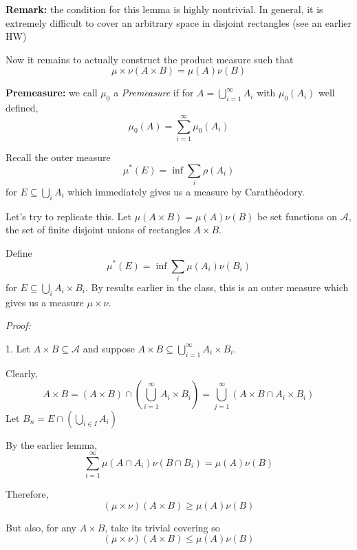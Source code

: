 \documentclass[12pt]{report}
\newcommand{\A}{\mathcal{A}}
\newcommand{\sub}{\subseteq}
\newcommand*{\tbf}[1]{\ifmmode\mathbf{#1}\else\textbf{#1}\fi}
\newenvironment*{tbox}[2][gray]{
    \begin{tcolorbox}[
        parbox=false,
        colback=#1!5!white,
        colframe=#1!75!black,
        breakable,
        title={#2}
    ]}
    {\end{tcolorbox}}
\begin{document}
        \tbf{Remark:} the condition for this lemma is highly nontrivial. In general, it is extremely difficult to cover an arbitrary space in disjoint rectangles (see an earlier HW)

        Now it remains to actually construct the product measure such that 
        \[\mu \times \nu(A \times B) = \mu(A) \nu(B)\]

        \tbf{Premeasure:} we call $\mu_0$ a \emph{Premeasure} if for $A = \bigcup_{i=1}^\infty A_i$ with $\mu_0(A_i)$ well defined, 
        \[\mu_0(A) = \sum_{i=1}^\infty \mu_0(A_i)\]

        Recall the outer measure 
        \[\mu^*(E) = \inf \sum_i \rho(A_i)\]
        for $E \sub \bigcup_i A_i$ which immediately gives us a measure by Carathéodory. 

        Let's try to replicate this. Let $\mu(A \times B) = \mu(A) \nu(B)$ be set functions on $\A$, the set of finite disjoint unions of rectangles $A \times B$. 
        
        Define
        \[\mu^*(E) = \inf \sum_i \mu(A_i) \nu(B_i)\]
        for $E \sub \bigcup_i A_i \times B_i$. By results earlier in the class, this is an outer measure which gives us a measure $\mu \times \nu$. 

        \begin{tbox}{\textbf{Lemma:}
            \begin{enumerate}
                \item $\mu \times \nu(A \times B) = \mu(A) \nu(B)$
                \item $\A$ is $\mu\times \nu$-measurable
            \end{enumerate}}
            \emph{Proof:} 

            1. Let $A \times B \sub \A$ and suppose $A \times B \sub \bigcup_{i=1}^\infty A_i \times B_i$. 

            Clearly, 
            \[A \times B = (A \times B) \cap \left(\bigcup_{i=1}^\infty A_i \times B_i\right) = \bigcup_{j=1}^\infty (A\times B \cap A_i \times B_i)\]
            Let $B_n = E \cap \left(\bigcup_{i \in I} A_i \right)$

            By the earlier lemma, 
            \[\sum_{i=1}^\infty \mu(A \cap A_i) \nu(B \cap B_i) = \mu(A) \nu(B)\] 

            Therefore, 
            \[(\mu \times \nu)(A\times B) \geq \mu(A) \nu(B)\]

            But also, for any $A\times B$, take its trivial covering so 
            \[(\mu \times \nu) (A \times B) \leq \mu(A) \nu(B)\]
        \end{tbox}
\end{document}
